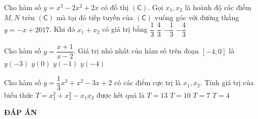 \begin{ex}%
Cho hàm số $y=x^3-2x^2+2x$ có đồ thị $(\mathsf{C})$. Gọi $x_1, x_2$ là hoành độ các điểm $M,N$ trên $(\mathsf{C})$ mà tại đó tiếp tuyến của $(\mathsf{C})$ vuông góc với đường thẳng $y=-x+2017$. Khi đó $x_1+x_2$ có giá trị bằng
\choice
{$\dfrac{1}{3}$}
{\True $\dfrac{4}{3}$}
{$-\dfrac{1}{3}$}
{$-\dfrac{4}{3}$}
\end{ex}

\begin{ex}%
Cho hàm số $y=\dfrac{x+1}{x-2}$. Giá trị nhỏ nhất của hàm số trên đoạn $[-4;0]$ là
\choice
{$y(-3)$}
{\True $y(0)$}
{$y(-1)$}
{$y(-4)$}
\end{ex}

\begin{ex}%
Cho hàm số $y=\dfrac{1}{3}x^3+x^2-3x+2$ có các điểm cực trị là $x_1, x_2$. Tính giá trị của biểu thức $T=x_1^2+x_2^2-x_1x_2$ được kết quả là
\choice
{\True $T=13$}
{$T=10$}
{$T=7$}
{$T=4$}
\end{ex}
\newpage
\begin{center}
	\textbf{ĐÁP ÁN}
\end{center}
\begin{multicols}{10}
	 
\end{multicols}


